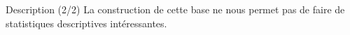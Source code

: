 \documentclass[french, 9pt,xcolor={table,dvipsnames},t,aspectratio=169,onlytextwidth,mathserif]{beamer}
\begin{document}
{\begin{frame}{Description (2/2)}
    La construction de cette base ne nous permet pas de faire de statistiques descriptives intéressantes.
\end{frame}
}







\end{document}
